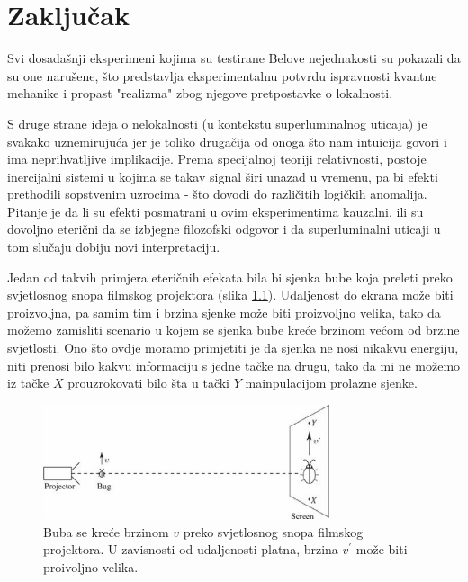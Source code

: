 \chapter{Zaključak}

Svi dosadašnji eksperimeni kojima su testirane Belove nejednakosti su pokazali da su one narušene, što predstavlja eksperimentalnu potvrdu ispravnosti kvantne mehanike i propast "realizma" zbog njegove pretpostavke o lokalnosti.

S druge strane ideja o nelokalnosti (u kontekstu superluminalnog uticaja) je svakako uznemiruju\' ca jer je toliko druga\v cija od onoga \v sto nam intuicija govori i ima neprihvatljive implikacije.
Prema specijalnoj teoriji relativnosti, postoje inercijalni sistemi u kojima se takav signal \v siri unazad u vremenu, pa bi efekti prethodili sopstvenim uzrocima - \v sto dovodi do
razli\v citih logi\v ckih anomalija.
Pitanje je da li su efekti posmatrani u ovim eksperimentima kauzalni, ili su dovoljno eteri\v cni da se izbjegne filozofski odgovor i da superluminalni uticaji u tom slu\v caju
dobiju novi interpretaciju.

Jedan od takvih primjera eteri\v cnih efekata bila bi sjenka bube koja preleti preko svjetlosnog snopa filmskog projektora (slika \ref{fig:bug_on_screen}). Udaljenost do ekrana mo\v ze biti proizvoljna, pa samim tim i brzina sjenke
mo\v ze biti proizvoljno velika, tako da mo\v zemo zamisliti scenario u kojem se sjenka bube kre\' ce brzinom ve\' com od brzine svjetlosti.
Ono \v sto ovdje moramo primjetiti je da sjenka ne nosi nikakvu energiju, niti prenosi bilo kakvu informaciju s jedne ta\v cke na drugu, tako da mi ne mo\v zemo iz ta\v cke $X$ prouzrokovati bilo
\v sta u ta\v cki $Y$ mainpulacijom prolazne sjenke.

\begin{figure}[H]
    \centering
    \includegraphics[width=0.75\textwidth]{figures/bug_on_screen.eps}
    \caption{Buba se kre\' ce brzinom $v$ preko svjetlosnog snopa filmskog projektora. U zavisnosti od udaljenosti platna, brzina $v^{'}$ mo\v ze biti proivoljno velika.}
    \label{fig:bug_on_screen}
\end{figure}

